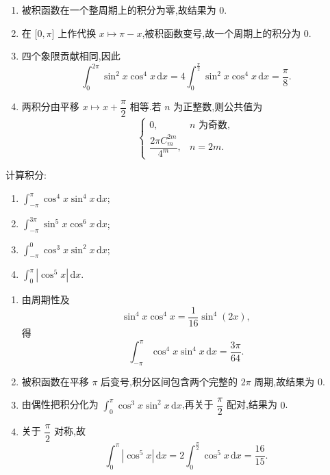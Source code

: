 \begin{solution}
    \leavevmode
    \begin{enumerate}
        \item 被积函数在一个整周期上的积分为零,故结果为 $\boxed{0}$.
        \item 在 $\lbrack0,\pi\rbrack$ 上作代换 $x\mapsto\pi-x$,被积函数变号,故一个周期上的积分为 $\boxed{0}$.
        \item 四个象限贡献相同,因此
              \[
                  \displaystyle\int_0^{2\pi}\sin^2x\cos^4x\,\mathrm{d}x
                  =4\int_0^{\frac{\pi}{2}}\sin^2x\cos^4x\,\mathrm{d}x
                  =\boxed{\dfrac{\pi}{8}}.
              \]
        \item 两积分由平移 $x\mapsto x+\dfrac{\pi}{2}$ 相等.若 $n$ 为正整数,则公共值为
              \[
                  \begin{cases}
                      0,                          & n\text{ 为奇数}, \\[4pt]
                      \dfrac{2\pi C_m^{2m}}{4^m}, & n=2m.
                  \end{cases}
              \]
    \end{enumerate}
\end{solution}

\begin{example}
    计算积分:
    \begin{enumerate}
        \item $\displaystyle\int_{-\pi}^{\pi}\cos^4x\sin^4x\,\mathrm{d}x$;
        \item $\displaystyle\int_{-\pi}^{3\pi}\sin^5x\cos^6x\,\mathrm{d}x$;
        \item $\displaystyle\int_{-\pi}^{0}\cos^3x\sin^2x\,\mathrm{d}x$;
        \item $\displaystyle\int_0^\pi|\cos^5x|\,\mathrm{d}x$.
    \end{enumerate}
\end{example}
\exampleblank

\begin{solution}
    \leavevmode
    \begin{enumerate}
        \item 由周期性及
              \[
                  \sin^4x\cos^4x=\dfrac{1}{16}\sin^4(2x),
              \]
              得
              \[
                  \displaystyle\int_{-\pi}^{\pi}\cos^4x\sin^4x\,\mathrm{d}x
                  =\boxed{\dfrac{3\pi}{64}}.
              \]
        \item 被积函数在平移 $\pi$ 后变号,积分区间包含两个完整的 $2\pi$ 周期,故结果为 $\boxed{0}$.
        \item 由偶性把积分化为 $\displaystyle\int_0^\pi\cos^3x\sin^2x\,\mathrm{d}x$,再关于 $\dfrac{\pi}{2}$ 配对,结果为 $\boxed{0}$.
        \item 关于 $\dfrac{\pi}{2}$ 对称,故
              \[
                  \displaystyle\int_0^\pi|\cos^5x|\,\mathrm{d}x
                  =2\int_0^{\frac{\pi}{2}}\cos^5x\,\mathrm{d}x
                  =\boxed{\dfrac{16}{15}}.
              \]
    \end{enumerate}
\end{solution}

